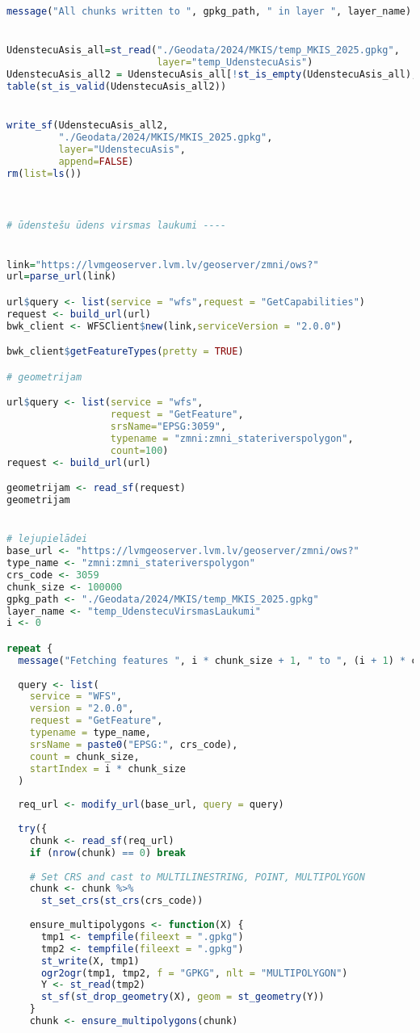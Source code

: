 \documentclass[
]{book}
\begin{document}
\begin{lstlisting}[language=R]
message("All chunks written to ", gpkg_path, " in layer ", layer_name)


UdenstecuAsis_all=st_read("./Geodata/2024/MKIS/temp_MKIS_2025.gpkg",
                          layer="temp_UdenstecuAsis")
UdenstecuAsis_all2 = UdenstecuAsis_all[!st_is_empty(UdenstecuAsis_all),,drop=FALSE] # 0
table(st_is_valid(UdenstecuAsis_all2))


write_sf(UdenstecuAsis_all2,
         "./Geodata/2024/MKIS/MKIS_2025.gpkg",
         layer="UdenstecuAsis",
         append=FALSE)
rm(list=ls())



# ūdenstešu ūdens virsmas laukumi ----


link="https://lvmgeoserver.lvm.lv/geoserver/zmni/ows?"
url=parse_url(link)

url$query <- list(service = "wfs",request = "GetCapabilities")
request <- build_url(url)
bwk_client <- WFSClient$new(link,serviceVersion = "2.0.0")

bwk_client$getFeatureTypes(pretty = TRUE)

# geometrijam

url$query <- list(service = "wfs",
                  request = "GetFeature",
                  srsName="EPSG:3059",
                  typename = "zmni:zmni_stateriverspolygon",
                  count=100)
request <- build_url(url)

geometrijam <- read_sf(request)
geometrijam


# lejupielādei
base_url <- "https://lvmgeoserver.lvm.lv/geoserver/zmni/ows?"
type_name <- "zmni:zmni_stateriverspolygon"
crs_code <- 3059
chunk_size <- 100000
gpkg_path <- "./Geodata/2024/MKIS/temp_MKIS_2025.gpkg"
layer_name <- "temp_UdenstecuVirsmasLaukumi"
i <- 0

repeat {
  message("Fetching features ", i * chunk_size + 1, " to ", (i + 1) * chunk_size, "...")
  
  query <- list(
    service = "WFS",
    version = "2.0.0",
    request = "GetFeature",
    typename = type_name,
    srsName = paste0("EPSG:", crs_code),
    count = chunk_size,
    startIndex = i * chunk_size
  )
  
  req_url <- modify_url(base_url, query = query)
  
  try({
    chunk <- read_sf(req_url)
    if (nrow(chunk) == 0) break
    
    # Set CRS and cast to MULTILINESTRING, POINT, MULTIPOLYGON
    chunk <- chunk %>%
      st_set_crs(st_crs(crs_code))
    
    ensure_multipolygons <- function(X) {
      tmp1 <- tempfile(fileext = ".gpkg")
      tmp2 <- tempfile(fileext = ".gpkg")
      st_write(X, tmp1)
      ogr2ogr(tmp1, tmp2, f = "GPKG", nlt = "MULTIPOLYGON")
      Y <- st_read(tmp2)
      st_sf(st_drop_geometry(X), geom = st_geometry(Y))
    }
    chunk <- ensure_multipolygons(chunk)
    

\end{lstlisting}
\end{document}
